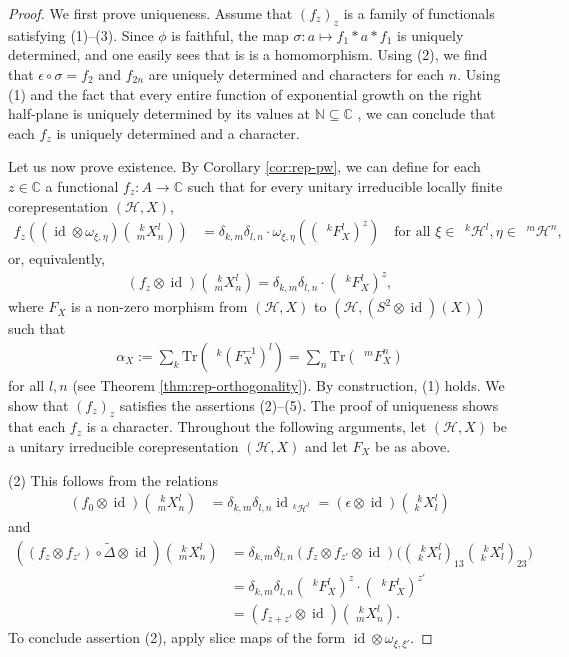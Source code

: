 \documentclass[12pt]{article}
\theoremstyle{change}
\DeclareMathOperator{\id}{id}
\newcommand{\C}{\mathbb{C}}
\newcommand{\N}{\mathbb{N}}
\newcommand{\Tr}{\mathrm{Tr}}
\newcommand{\Gr}[5]{\;{}^{\;#2}_{#4}#1_{#5}^{#3}}%
\newcommand{\Gru}[3]{\;{}^{\;#2}#1^{#3}}
\theoremstyle{definition}
\numberwithin{equation}{section}
\begin{document}
\begin{proof}
  We first prove uniqueness.  Assume that $(f_{z})_{z}$ is a family of
  functionals satisfying (1)--(3).  Since $\phi$ is faithful, the map
  $\sigma\colon a \mapsto f_{1} \ast a \ast f_{1}$ is uniquely
  determined, and one easily sees that is is a homomorphism. Using
  (2), we find that $\epsilon \circ \sigma=f_{2}$ and $f_{2n}$ are
  uniquely determined and characters for each $n$. Using (1) and the
  fact that every entire function of exponential growth on the right
  half-plane is uniquely determined by its values at $\N \subseteq \C$
  \cite{}, we can conclude that each $f_{z}$ is uniquely determined
  and a character.

  Let us now prove existence.  By Corollary \ref{cor:rep-pw}, we can
  define for each $z\in \C$ a functional $f_{z} \colon A \to \C$ such
  that for every unitary irreducible locally finite corepresentation
  $(\mathcal{H},X)$,
    \begin{align*}
      f_{z}((\id \otimes \omega_{\xi,\eta})(\Gr{X}{k}{l}{m}{n})) &=
      \delta_{k,m}\delta_{l,n} \cdot
      \omega_{\xi,\eta}((\Gru{F_{X}}{k}{l})^{z}) \quad \text{for all }
      \xi \in \Gru{\mathcal{H}}{k}{l},\eta \in
      \Gru{\mathcal{H}}{m}{n},
    \end{align*}
    or, equivalently,
    \begin{align*}
      (f_{z} \otimes \id)(\Gr{X}{k}{l}{m}{n}) =
      \delta_{k,m}\delta_{l,n} \cdot (\Gru{F_{X}}{k}{l})^{z},
    \end{align*}
    where $F_{X}$ is a non-zero morphism from $(\mathcal{H},X)$ to
    $(\mathcal{H}, (S^{2} \otimes \id)(X))$ such that
    \begin{align*}
      \alpha_{X}:= \sum_{k} \Tr(\Gru{(F_{X}^{-1})}{k}{l}) = \sum_{n}
      \Tr(\Gru{F_{X}}{m}{n})
    \end{align*}
    for all $l,n$ (see Theorem \ref{thm:rep-orthogonality}). By
    construction, (1) holds. We show that $(f_{z})_{z}$ satisfies the
    assertions (2)--(5). The proof of uniqueness shows that each
    $f_{z}$ is a character. Throughout the following arguments, let 
    $(\mathcal{H},X)$ be a unitary irreducible corepresentation
    $(\mathcal{H},X)$ and let $F_{X}$ be as above.

    (2) This follows from the relations
    \begin{align*}
      (f_{0}  \otimes \id)(\Gr{X}{k}{l}{m}{n}) &=
      \delta_{k,m}\delta_{l,n} \id_{\Gru{\mathcal{H}}{k}{l}} =
      (\epsilon \otimes \id)(\Gr{X}{k}{l}{k}{l})
    \end{align*}
    and
    \begin{align*}
      ((f_{z}\otimes f_{z'})\circ \tilde \Delta \otimes
      \id)(\Gr{X}{k}{l}{m}{n}) &=  \delta_{k,m}\delta_{l,n}(f_{z} \otimes f_{z'} \otimes
      \id)\big((\Gr{X}{k}{l}{k}{l})_{13}
      (\Gr{X}{k}{l}{k}{l})_{23}\big) \\
      &=  \delta_{k,m}\delta_{l,n}(\Gru{F_{X}}{k}{l})^{z}  \cdot (\Gru{F_{X}}{k}{l})^{z'} \\
      &= (f_{z+z'} \otimes \id)(\Gr{X}{k}{l}{m}{n}).
    \end{align*}
    To conclude assertion (2), apply slice maps of the form $\id
    \otimes \omega_{\xi,\xi'}$.


\end{proof}
\end{document}
